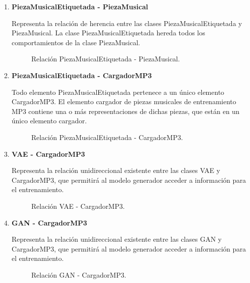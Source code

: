 \begin{enumerate}
  \item \textbf{PiezaMusicalEtiquetada - PiezaMusical}

  Representa la relación de herencia entre las clases PiezaMusicalEtiquetada y PiezaMusical. La clase PiezaMusicalEtiquetada hereda todos los comportamientos de la clase PiezaMusical.

  \begin{figure}[H]
    \centering
    
    \caption{Relación PiezaMusicalEtiquetada - PiezaMusical.}
  \end{figure}

  \item \textbf{PiezaMusicalEtiquetada - CargadorMP3}

  Todo elemento PiezaMusicalEtiquetada pertenece a un único elemento CargadorMP3. El elemento cargador de piezas musicales de entrenamiento MP3 contiene una o más representaciones de dichas piezas, que están en un único elemento cargador.

  \begin{figure}[H]
    \centering
    
    \caption{Relación PiezaMusicalEtiquetada - CargadorMP3.}
  \end{figure}

  \item \textbf{VAE - CargadorMP3}

  Representa la relación unidireccional existente entre las clases VAE y CargadorMP3, que permitirá al modelo generador acceder a información para el entrenamiento.

  \begin{figure}[H]
    \centering
    
    \caption{Relación VAE - CargadorMP3.}
  \end{figure}

  \item \textbf{GAN - CargadorMP3}

  Representa la relación unidireccional existente entre las clases GAN y CargadorMP3, que permitirá al modelo generador acceder a información para el entrenamiento.

  \begin{figure}[H]
    \centering
    
    \caption{Relación GAN - CargadorMP3.}
  \end{figure}


\end{enumerate}

